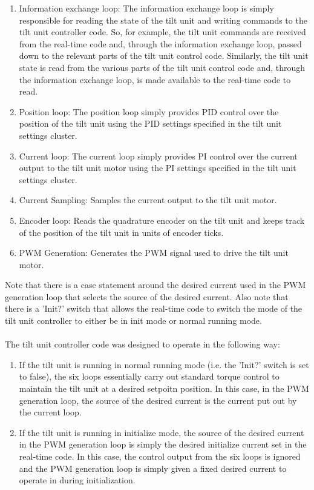 \begin{enumerate}
\item Information exchange loop: The information exchange loop is simply responsible for reading the state of the tilt unit and writing commands to the tilt unit controller code. So, for example, the tilt unit commands are received from the real-time code and, through the information exchange loop, passed down to the relevant parts of the tilt unit control code. Similarly, the tilt unit state is read from the various parts of the tilt unit control code and, through the information exchange loop, is made available to the real-time code to read.
\item Position loop: The position loop simply provides PID control over the position of the tilt unit using the PID settings specified in the tilt unit settings cluster.
\item Current loop: The current loop simply provides PI control over the current output to the tilt unit motor using the PI settings specified in the tilt unit settings cluster.
\item Current Sampling: Samples the current output to the tilt unit motor.
\item Encoder loop: Reads the quadrature encoder on the tilt unit and keeps track of the position of the tilt unit in units of encoder ticks.
\item PWM Generation: Generates the PWM signal used to drive the tilt unit motor. 
\end{enumerate}

\noindent Note that there is a case statement around the desired current used in the PWM generation loop that selects the source of the desired current. Also note that there is a 'Init?' switch that allows the real-time code to switch the mode of the tilt unit controller to either be in init mode or normal running mode. \\ \\
%
The tilt unit controller code was designed to operate in the following way:

\begin{enumerate}
\item If the tilt unit is running in normal running mode (i.e. the 'Init?' switch is set to false), the six loops essentially carry out standard torque control to maintain the tilt unit at a desired setpoitn position. In this case, in the PWM generation loop, the source of the desired current is the current put out by the current loop.
\item If the tilt unit is running in initialize mode, the source of the desired current in the PWM generation loop is simply the desired initialize current set in the real-time code. In this case, the control output from the six loops is ignored and the PWM generation loop is simply given a fixed desired current to operate in during initialization.
\end{enumerate}

